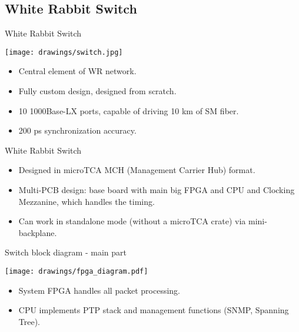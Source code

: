 \documentclass[compress,red]{beamer}
\begin{document}

\subsection {White Rabbit Switch}


\begin{frame}{White Rabbit Switch}
\begin{center}
\texttt{[image: drawings/switch.jpg]}
\end{center}
\begin{itemize}
\item Central element of WR network.
\item Fully custom design, designed from scratch.
\item 10 1000Base-LX ports, capable of driving 10 km of SM fiber.
\item 200 ps synchronization accuracy.
\end{itemize}
\end{frame}

\begin{frame}{White Rabbit Switch}
\begin{itemize}
\item Designed in microTCA MCH (Management Carrier Hub) format.
\item Multi-PCB design: base board with main big FPGA and CPU and Clocking Mezzanine, which handles the timing.
\item Can work in standalone mode (without a microTCA crate) via mini-backplane.
\end{itemize}
\end{frame}

\begin{frame}{Switch block diagram - main part}
\begin{center}
\texttt{[image: drawings/fpga\_diagram.pdf]}
\end{center}
\begin{itemize}
\item System FPGA handles all packet processing.
\item CPU implements PTP stack and management functions (SNMP, Spanning Tree).
\end{itemize}
\end{frame}
\end{document}
